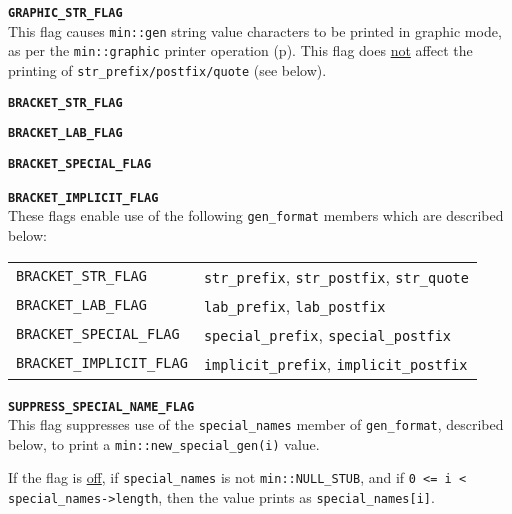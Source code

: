 \documentclass[12pt]{article}
\makeatletter
\newcommand{\TT}[1]{{\tt \bfseries #1}}
\newcommand{\ttkey}[1]{\TT{#1}\index{#1@{\tt #1}}}
\newcommand{\ttmkey}[2]{\TT{#1}\index{#1@{\tt #1}!#2}}
\newcommand{\pagref}[1]{p\pageref{#1}}
\newcommand{\EOL}{\penalty \exhyphenpenalty}
\newenvironment{indpar}[1][0.3in]%
	{\begin{list}{}%
		     {\setlength{\itemsep}{0in}%
		      \setlength{\topsep}{0in}%
		      \setlength{\parsep}{1ex}%
		      \setlength{\labelwidth}{#1}%
		      \setlength{\leftmargin}{#1}%
		      \addtolength{\leftmargin}{\labelsep}}%
	 \item}%
	{\end{list}}
\newenvironment{itemlist}[1][1.2in]%
	{\begin{list}{}{\setlength{\labelwidth}{#1}%
		        \setlength{\leftmargin}{\labelwidth}%
		        \addtolength{\leftmargin}{+0.2in}%
		        \renewcommand{\makelabel}[1]{##1\hfill}}}%
	{\end{list}}
\makeatother
\begin{document}
\begin{indpar}[0.1in]\begin{itemlist}[0.4in]

\item[\ttmkey{GRAPHIC\_STR\_FLAG}{{\tt min::gen\_format} flag}]~\\
This flag causes {\tt min::gen} string value characters to be printed
in graphic mode, as per the {\tt min::graphic} printer operation
(\pagref{MIN::GRAPHIC}).  This flag does \underline{not} affect the
printing of {\tt str\_\EOL pre\-fix/\EOL post\-fix/\EOL quote} (see below).

\item[\ttkey{BRACKET\_STR\_FLAG}]
\item[\ttkey{BRACKET\_LAB\_FLAG}]\vspace{-1ex}
\item[\ttkey{BRACKET\_SPECIAL\_FLAG}]\vspace{-1ex}
\item[\ttkey{BRACKET\_IMPLICIT\_FLAG}]\vspace{-1ex}~\\
These flags enable use of the following {\tt gen\_\EOL format}
members which are described below:
\begin{center}
\begin{tabular}{l@{~~~~~~~~~~}l}
{\tt BRACKET\_STR\_FLAG}	& {\tt str\_prefix},
				  {\tt str\_postfix},
				  {\tt str\_quote}
\\
{\tt BRACKET\_LAB\_FLAG}	& {\tt lab\_prefix},
				  {\tt lab\_postfix}
\\
{\tt BRACKET\_SPECIAL\_FLAG}	& {\tt special\_prefix},
				  {\tt special\_postfix}
\\
{\tt BRACKET\_IMPLICIT\_FLAG}	& {\tt implicit\_prefix},
				  {\tt implicit\_postfix}

\end{tabular}
\end{center}

\item[\ttkey{SUPPRESS\_SPECIAL\_NAME\_FLAG}]~\\
This flag suppresses use of the
{\tt special\_\EOL names} member
of {\tt gen\_\EOL format}, described below, to
print a {\tt min::\EOL new\_\EOL special\_\EOL gen(i)} value.

If the flag is \underline{off}, if {\tt special\_\EOL names}
is not {\tt min::\EOL NULL\_\EOL STUB}, and if
{\tt 0 <= i < special\_\EOL names->\EOL length}, then
the value prints as {\tt special\_\EOL names[i]}.


\end{itemlist}
\end{indpar}
\end{document}

